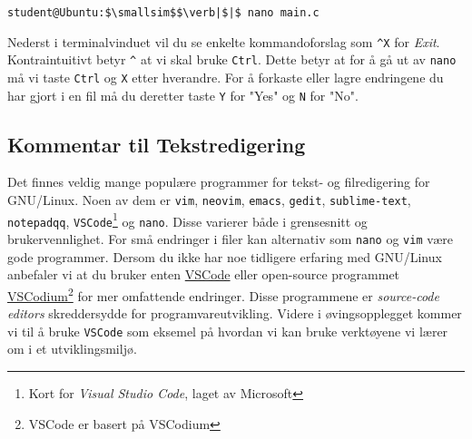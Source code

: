 \begin{alphasection}
\begin{lstlisting}[mathescape=true]
student@Ubuntu:$\smallsim$$\verb|$|$ nano main.c
\end{lstlisting}

Nederst i terminalvinduet vil du se enkelte kommandoforslag som \verb|^X| for \textit{Exit}. Kontraintuitivt betyr \verb|^| at vi skal bruke \verb|Ctrl|. Dette betyr at for å gå ut av \verb|nano| må vi taste \verb|Ctrl| og \verb|X| etter hverandre. For å forkaste eller lagre endringene du har gjort i en fil må du deretter taste \verb|Y| for "Yes" og \verb|N| for "No".

\cprotect\subsection{Kommentar til Tekstredigering}

Det finnes veldig mange populære programmer for tekst- og filredigering for GNU/Linux. Noen av dem er \verb|vim|, \verb|neovim|, \verb|emacs|, \verb|gedit|, \verb|sublime-text|, \verb|notepadqq|, \verb|VSCode|\footnote{Kort for \textit{Visual Studio Code}, laget av Microsoft} og \verb|nano|. Disse varierer både i grensesnitt og brukervennlighet. For små endringer i filer kan alternativ som \verb|nano| og \verb|vim| være gode programmer. Dersom du ikke har noe tidligere erfaring med GNU/Linux anbefaler vi at du bruker enten \href{https://code.visualstudio.com/}{VSCode} eller open-source programmet \href{https://github.com/VSCodium/vscodium}{VSCodium}\footnote{VSCode er basert på VSCodium} for mer omfattende endringer. Disse programmene er \textit{source-code editors} skreddersydde for programvareutvikling. Videre i øvingsopplegget kommer vi til å bruke \verb|VSCode| som eksemel på hvordan vi kan bruke verktøyene vi lærer om i et utviklingsmiljø.

\end{alphasection}
\setcounter{section}{0}

